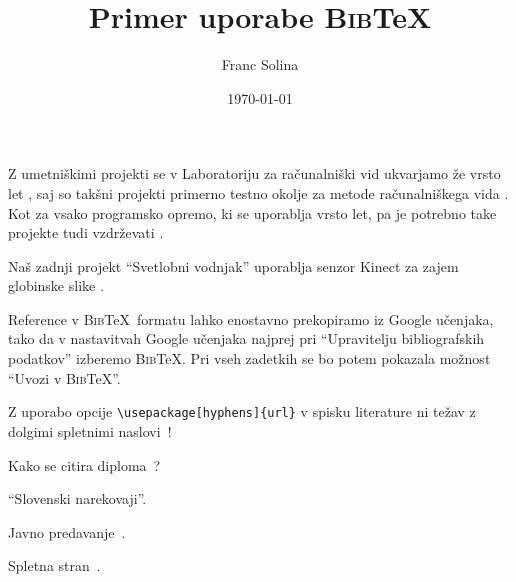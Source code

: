 \documentclass[12pt,a4paper]{article}
\title{Primer uporabe \textsc{Bib}\TeX}
\author{Franc Solina}
\date{\today}
\begin{document}
\newcommand{\sn}[1]{"`#1"'}

\maketitle


Z umetni\v skimi projekti se v Laboratoriju za ra\v cunalni\v ski vid ukvarjamo \v ze vrsto let \cite{leonardo,IS2001}, saj so tak\v sni projekti primerno testno okolje za metode ra\v cunalni\v skega vida \cite{poglavje_springer}.
Kot za vsako programsko opremo, ki se uporablja vrsto let, pa je potrebno take projekte tudi vzdr\v zevati \cite{ZKM}.

Na\v s zadnji projekt \sn{Svetlobni vodnjak} \cite{video} uporablja senzor Kinect za zajem globinske slike \cite{andersen2012kinect}.

Reference v \textsc{Bib}\TeX\ formatu lahko enostavno prekopiramo iz Google u\v cenjaka, tako da v nastavitvah Google u\v cenjaka najprej pri "`Upravitelju bibliografskih podatkov"' izberemo \textsc{Bib}\TeX.
Pri vseh zadetkih se bo potem pokazala mo\v znost \sn{Uvozi v \textsc{Bib}\TeX}.

Z uporabo opcije
\verb+\usepackage[hyphens]{url}+ v spisku literature ni te\v zav z dolgimi spletnimi naslovi~\cite{bimgrwm}!

Kako se citira diploma~\cite{diploma}?

\sn{Slovenski narekovaji}.

Javno predavanje~\cite{src1}.

Spletna stran~\cite{nscu}.



\end{document}
